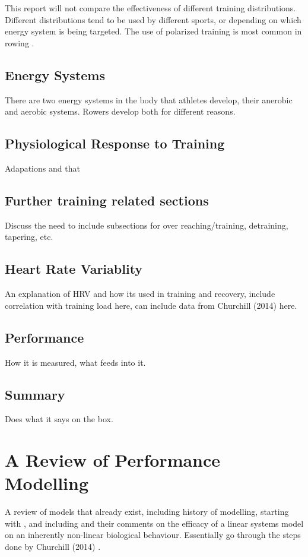 This report will not compare the effectiveness of different training distributions. Different distributions tend to be used by different sports, or depending on which energy system is being targeted. The use of polarized training is most common in rowing \autocite{Rosenblat2019}.


\subsection{Energy Systems}
There are two energy systems in the body that athletes develop, their anerobic and aerobic systems. Rowers develop both for different reasons.

\subsection{Physiological Response to Training}
Adapations and that

\subsection{Further training related sections}
Discuss the need to include subsections for over reaching/training, detraining, tapering, etc.

\subsection{Heart Rate Variablity}
An explanation of HRV and how its used in training and recovery, include correlation with training load here, can include data from Churchill (2014) \autocite{Churchill2014} here.

\subsection{Performance}
How it is measured, what feeds into it.

\subsection{Summary}
Does what it says on the box.

\section{A Review of Performance Modelling}
A review of models that already exist, including history of modelling, starting with \textcite{Bannister1976}, and including \textcite{Edelmannnusser2002} and their comments on the efficacy of a linear systems model on an inherently non-linear biological behaviour. Essentially go through the steps done by Churchill (2014) \autocite{Churchill2014}.

